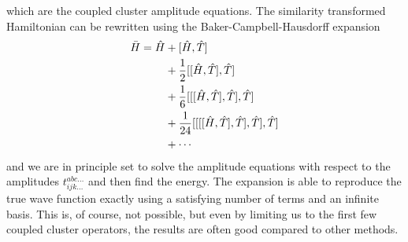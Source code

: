 which are the coupled cluster amplitude equations. The similarity transformed Hamiltonian can be rewritten using the Baker-Campbell-Hausdorff expansion
\begin{align}
	\label{eq:BCH}
	\bar{H} = \hat{H} &+ [\hat{H},\hat{T}]\notag \\
	&+ \frac{1}{2}[[\hat{H},\hat{T}],\hat{T}]\notag \\
	&+ \frac{1}{6}[[[\hat{H},\hat{T}],\hat{T}],\hat{T}] \\
	&+ \frac{1}{24}[[[[\hat{H},\hat{T}],\hat{T}],\hat{T}],\hat{T}] \notag \\
	&+ \cdots \notag
\end{align}
and we are in principle set to solve the amplitude equations with respect to the amplitudes $t_{ijk\hdots}^{abc\hdots}$ and then find the energy. The expansion is able to reproduce the true wave function exactly using a satisfying number of terms and an infinite basis. This is, of course, not possible, but even by limiting us to the first few coupled cluster operators, the results are often good compared to other methods. \cite{daniel_crawford_introduction_2007}